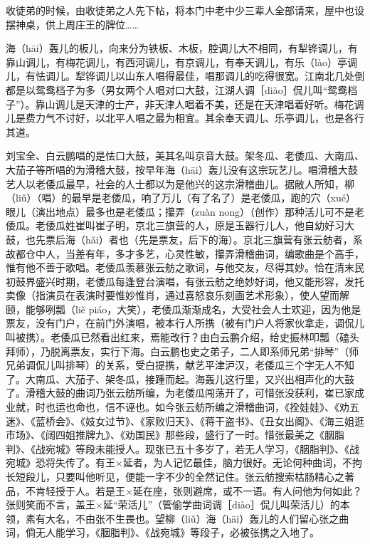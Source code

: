 \documentclass[12pt,UTF8]{ctexbook}
\begin{document}
收徒弟的时候，由收徒弟之人先下帖，将本门中老中少三辈人全部请来，屋中也设摆神桌，供上周庄王的牌位……



海（hāi）轰儿的板儿，向来分为铁板、木板，腔调儿大不相同，有犁铧调儿，有靠山调儿，有梅花调儿，有西河调儿，有京调儿，有奉天调儿，有乐（lào）亭调儿，有怯调儿。犁铧调儿以山东人唱得最佳，唱那调儿的吃得很宽。江南北几处倒都是以鸳鸯档子为多（男女两个人唱对口大鼓，江湖人调［diào］侃儿叫“鸳鸯档子”）。靠山调儿是天津的士产，非天津人唱着不美，还是在天津唱着好听。梅花调儿是费力气不讨好，以北平人唱之最为相宜。其余奉天调儿、乐亭调儿，也是各行其道。

刘宝全、白云鹏唱的是怯口大鼓，美其名叫京音大鼓。架冬瓜、老倭瓜、大南瓜、大茄子等所唱的为滑稽大鼓，按早年海（hāi）轰儿没有这宗玩艺儿。唱滑稽大鼓艺人以老倭瓜最早，社会的人士都以为是他兴的这宗滑稽曲儿。据敝人所知，柳（liǔ）（唱）的最早是老倭瓜，响了万儿（有了名了）是老倭瓜，跑的穴（xué）眼儿（演出地点）最多也是老倭瓜；攥弄（zuàn nong）（创作）那种活儿可不是老倭瓜。老倭瓜姓崔叫崔子明，京北三旗营的人，原是玉器行儿人，他自幼好习大鼓，也先票后海（hǎi）者也（先是票友，后下的海）。京北三旗营有张云舫者，系故都仓中人，当差有年，多才多艺，心灵性敏，攥弄滑稽曲词，编歌曲是个高手，惟有他不善于歌唱。老倭瓜羡慕张云舫之歌词，与他交友，尽得其妙。恰在清末民初鼓界盛兴时期，老倭瓜每逢登台演唱，有张云舫之绝妙好词，他又能形容，发托卖像（指演员在表演时要惟妙惟肖，通过喜怒哀乐刻画艺术形象），使人望而解颐，能够咧瓢（liě piáo，大笑），老倭瓜渐渐成名，大受社会人士欢迎，因为他是票友，没有门户，在前门外演唱，被本行人所携（被有门户人将家伙拿走，调侃儿叫被携）。老倭瓜已然看出红来，焉能改行？由白云鹏介绍，给史振林叩瓢（磕头拜师），乃脱离票友，实行下海。白云鹏也史之弟子，二人即系师兄弟“排琴”（师兄弟调侃儿叫排琴）的关系，受白提携，献艺平津沪汉，老倭瓜三个字无人不知了。大南瓜、大茄子、架冬瓜，接踵而起。海轰儿这行里，又兴出相声化的大鼓了。滑稽大鼓的曲词乃张云舫所编，为老倭瓜闯荡开了，可惜张没获利，崔已家成业就，时也运也命也，信不诬也。如今张云舫所编之滑稽曲词，《拴娃娃》、《劝五迷》、《蓝桥会》、《妓女过节》、《家败归天》、《蒋干盗书》、《丑女出阁》、《海三姐逛市场》、《阔四姐推牌九》、《劝国民》那些段，盛行了一时。惜张最美之《胭脂判》、《战宛城》等段未能授人。现张已五十多岁了，若无人学习，《胭脂判》、《战宛城》恐将失传了。有王×延者，为人记忆最佳，脑力很好。无论何种曲词，不拘长短段儿，只要叫他听见，便能一字不少的全然记住。张云舫搜索枯肠精心之著品，不肯轻授于人。若是王×延在座，张则避席，或不一语。有人问他为何如此？张则笑而不言，盖王×延“荣活儿”（管偷学曲词调［diào］侃儿叫荣活儿）的本领，素有大名，不由张不生畏也。望柳（liǔ）海（hāi）轰儿的人们留心张之曲词，倘无人能学习，《胭脂判》、《战宛城》等段子，必被张携之入地了。
\end{document}
